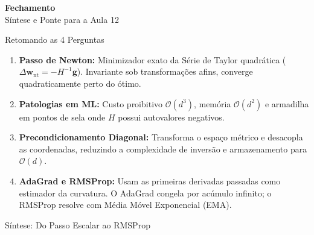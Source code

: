 \documentclass[aspectratio=169, 10pt]{beamer}
\begin{document}
\begin{frame}[plain]
  \centering
  \vspace{2cm}
  {\Huge \textcolor{unicampblue}{\textbf{Fechamento}}}\\
  \vspace{0.5cm}
  {\large \textcolor{unicampteal}{Síntese e Ponte para a Aula 12}}
\end{frame}

\begin{frame}{Retomando as 4 Perguntas}
  \begin{enumerate}
    \item \textbf{Passo de Newton:} Minimizador exato da Série de Taylor quadrática ($\Delta\mathbf{w}_{\text{nt}} = -H^{-1}\mathbf{g}$). Invariante sob transformações afins, converge quadraticamente perto do ótimo.
    \vspace{0.2cm}
    \item \textbf{Patologias em ML:} Custo proibitivo $\mathcal{O}(d^3)$, memória $\mathcal{O}(d^2)$ e armadilha em pontos de sela onde $H$ possui autovalores negativos.
    \vspace{0.2cm}
    \item \textbf{Precondicionamento Diagonal:} Transforma o espaço métrico e desacopla as coordenadas, reduzindo a complexidade de inversão e armazenamento para $\mathcal{O}(d)$.
    \vspace{0.2cm}
    \item \textbf{AdaGrad e RMSProp:} Usam as primeiras derivadas passadas como estimador da curvatura. O AdaGrad congela por acúmulo infinito; o RMSProp resolve com Média Móvel Exponencial (EMA).
  \end{enumerate}
\end{frame}

\begin{frame}{Síntese: Do Passo Escalar ao RMSProp}
  \centering
\end{frame}
\end{document}
